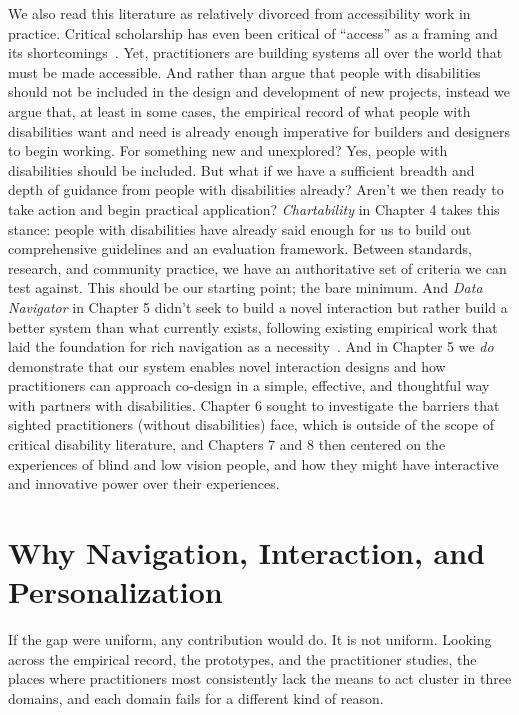 \documentclass[12pt]{cmuthesis}
\begin{document}
We also read this literature as relatively divorced from accessibility work in practice. Critical scholarship has even been critical of ``access'' as a framing and its shortcomings~\cite{Williams2021,Power2012Guidelines,Hamraie,Hamraie2017Building,Hamraie2017Designing}. Yet, practitioners are building systems all over the world that must be made accessible. And rather than argue that people with disabilities should not be included in the design and development of new projects, instead we argue that, at least in some cases, the empirical record of what people with disabilities want and need is already enough imperative for builders and designers to begin working. For something new and unexplored? Yes, people with disabilities should be included. But what if we have a sufficient breadth and depth of guidance from people with disabilities already? Aren't we then ready to take action and begin practical application? \textit{Chartability} in Chapter 4 takes this stance: people with disabilities have already said enough for us to build out comprehensive guidelines and an evaluation framework. Between standards, research, and community practice, we have an authoritative set of criteria we can test against. This should be our starting point; the bare minimum. And \textit{Data Navigator} in Chapter 5 didn't seek to build a novel interaction but rather build a better system than what currently exists, following existing empirical work that laid the foundation for rich navigation as a necessity~\cite{Zong2022Rich}. And in Chapter 5 we \textit{do} demonstrate that our system enables novel interaction designs and how practitioners can approach co-design in a simple, effective, and thoughtful way with partners with disabilities. Chapter 6 sought to investigate the barriers that sighted practitioners (without disabilities) face, which is outside of the scope of critical disability literature, and Chapters 7 and 8 then centered on the experiences of blind and low vision people, and how they might have interactive and innovative power over their experiences.
 
\section{Why Navigation, Interaction, and Personalization}
 
If the gap were uniform, any contribution would do. It is not uniform. Looking across the empirical record, the prototypes, and the practitioner studies, the places where practitioners most consistently lack the means to act cluster in three domains, and each domain fails for a different kind of reason.
 
\end{document}

